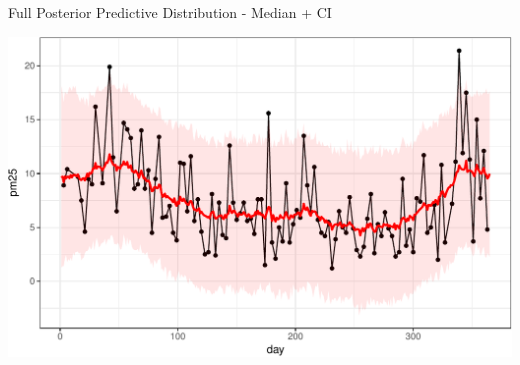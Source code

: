 \documentclass[11pt,ignorenonframetext,]{beamer}
\begin{document}
\begin{frame}{%
\protect\hypertarget{full-posterior-predictive-distribution---median-ci}{%
Full Posterior Predictive Distribution - Median + CI}}

\begin{center}\includegraphics[width=\textwidth]{Lec13_files/figure-beamer/unnamed-chunk-29-1} \end{center}

\end{frame}
\end{document}
